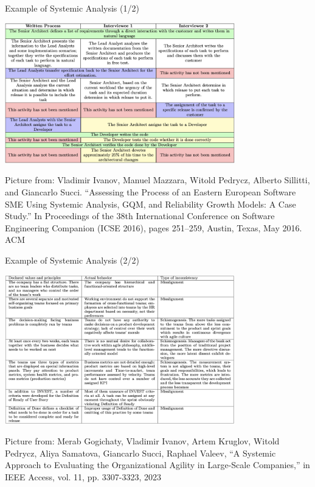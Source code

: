 \documentclass{beamer}
\begin{document}
\begin{frame}
{\centerline{Example of Systemic Analysis (1/2)}}

\begin{center}
 \includegraphics[width=10cm]{P2023.AIBCCSS.ExtendedMindDistributedCognitionSystemicThinking/ExampleSystemicAnalysis.jpg}
 
 \end{center}

\begin{center}
    \tiny{Picture from: Vladimir Ivanov, Manuel Mazzara, Witold Pedrycz, Alberto Sillitti, and Giancarlo Succi. ``Assessing the Process of an Eastern European Software SME Using Systemic Analysis, GQM, and Reliability Growth Models: A Case Study.'' In Proceedings of the 38th International Conference on Software Engineering Companion (ICSE 2016), pages 251–259, Austin, Texas, May 2016. ACM}
 \end{center}

\end{frame}

\begin{frame}
{\centerline{Example of Systemic Analysis (2/2)}}

\begin{center}
 \includegraphics[width=10cm]{P2023.AIBCCSS.ExtendedMindDistributedCognitionSystemicThinking/AkBars-Systemic.jpg}
 
 \end{center}

\begin{center}
    \tiny{Picture from: Merab Gogichaty, Vladimir Ivanov, Artem Kruglov, Witold Pedrycz, Aliya Samatova, Giancarlo Succi, Raphael Valeev, ``A Systemic Approach to Evaluating the Organizational Agility in Large-Scale Companies,'' in IEEE Access, vol. 11, pp. 3307-3323, 2023}
 \end{center}

\end{frame}
\end{document}
